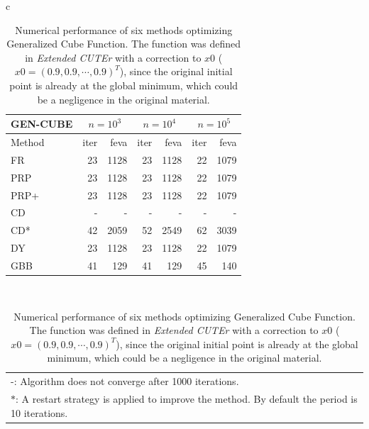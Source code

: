 \documentclass[11pt,a4paper]{article}
\begin{document}
\begin{table}
\label{tab2}
\centering
\begin{tabular}{c}
\begin{tabular}{l|rr|rr|rr}
\hline
\multicolumn{1}{c|}{\textbf{GEN-CUBE}} & \multicolumn{2}{c|}{$n=10^3$} & \multicolumn{2}{c|}{$n=10^4$} & \multicolumn{2}{c}{$n=10^5$} \\
\hline
Method & iter & feva & iter & feva & iter & feva \\
\hline
FR    &  23 & 1128 & 23 & 1128 & 22 & 1079 \\
PRP   &  23 & 1128 & 23 & 1128 & 22 & 1079 \\
PRP+  &  23 & 1128 & 23 & 1128 & 22 & 1079 \\
CD    &  - & - & - & - & - & - \\
CD*   &  42 & 2059 & 52 & 2549 & 62 & 3039 \\
DY    &  23 & 1128 & 23 & 1128 & 22 & 1079 \\
GBB   &  41 &  129 & 41 &  129 & 45 &  140 \\
\hline
\end{tabular} \\
\begin{tabular}{l}
  -: Algorithm does not converge after 1000 iterations. \\
  $*$: A restart strategy is applied to improve the method. By default the period is 10 iterations. \\
\end{tabular}
\end{tabular}
\caption{Numerical performance of six methods optimizing Generalized Cube Function. The function was defined in \textit{Extended CUTEr} with a correction to $x0$ ($x0=(0.9, 0.9, \cdots, 0.9)^T$), since the original initial point is already at the global minimum, which could be a negligence in the original material.}
\end{table}
\end{document}
